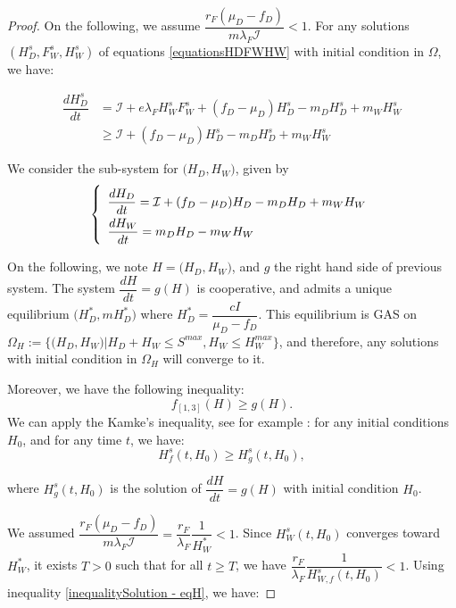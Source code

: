 \documentclass{article}
\newcommand{\lfw}{\lambda_{F}}
\newcommand{\lfw}{\lambda_{F}}
\newcommand{\cI}{\mathcal{I}}
\begin{document}
\begin{proof}
On the following, we assume $\dfrac{r_F(\mu_D-f_D)}{m\lfw \cI} < 1$. For any solutions $(H_D^s, F_W^s, H_W^s)$ of equations \eqref{equationsHDFWHW} with initial condition in $\Omega$, we have:

\begin{align*}
\dfrac{dH_D^s}{dt} &= \cI + e\lfw H_W^s F_W^s + (f_D - \mu_D) H_D^s - m_D H_D^s + m_W H_W^s \\
&\geq \cI + (f_D - \mu_D) H_D^s - m_D H_D^s + m_W H_W^s
\end{align*}

We consider the sub-system for $\Big(H_D, H_W\Big)$, given by
\begin{equation}
\def\arraystretch{2}
\left\{ \begin{array}{l}
\dfrac{dH_D}{dt}= \cI + (f_D - \mu_D) H_D- m_D H_D + m_W H_W \\
\dfrac{dH_W}{dt}= m_D H_D - m_W H_W 
\end{array}\right.
\label{limitSystem - eqH}
\end{equation}

On the following, we note $H = \Big(H_D, H_W\Big)$, and $g$ the right hand side of previous system. The system $\dfrac{dH}{dt} = g(H)$ is cooperative, and admits a unique equilibrium $\Big(H_D^*, mH_D^*\Big)$ where $H_D^* = \dfrac{cI}{\mu_D - f_D}$. This equilibrium is GAS on $\Omega_H := \Big\{\Big(H_D, H_W\Big) \Big | H_D + H_W \leq S^{max}, H_W \leq H^{max}_W \Big\}$, and therefore, any solutions with initial condition in $\Omega_H$ will converge to it.

Moreover, we have the following inequality: $$f_{[1,3]}(H) \geq g(H).$$ We can apply the Kamke's inequality, see for example \cite{kirkilionis_comparison_2004}: for any initial conditions $H_0$, and for any time $t$, we have:
\begin{equation}
H_f^s(t, H_0) \geq H_g^s(t, H_0),
\label{inequalitySolution - eqH}
\end{equation}

where $H_g^s(t, H_0)$ is the solution of $\dfrac{dH}{dt} = g(H)$ with initial condition $H_0$.

\medskip

We assumed $\dfrac{r_F(\mu_D-f_D)}{m\lfw \cI} = \dfrac{r_F}{\lfw}\dfrac{1}{H_W^*} < 1$. Since $H_W^s(t, H_0)$ converges toward $H_W^*$, it exists $T > 0$ such that for all $t \geq T$, we have $\dfrac{r_F}{\lfw}\dfrac{1}{H_{W, f}^s(t, H_0)} < 1$. Using inequality \eqref{inequalitySolution - eqH}, we have:


\end{proof}
\end{document}
